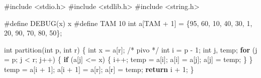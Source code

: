 \documentclass[
  brazilian,
  letterpaper,
]{book}
\newenvironment{Shaded}{\begin{snugshade}}{\end{snugshade}}
\newcommand{\CommentTok}[1]{\textcolor[rgb]{0.37,0.37,0.37}{#1}}
\newcommand{\ControlFlowTok}[1]{\textcolor[rgb]{0.00,0.23,0.31}{\textbf{#1}}}
\newcommand{\DataTypeTok}[1]{\textcolor[rgb]{0.68,0.00,0.00}{#1}}
\newcommand{\DecValTok}[1]{\textcolor[rgb]{0.68,0.00,0.00}{#1}}
\newcommand{\ImportTok}[1]{\textcolor[rgb]{0.00,0.46,0.62}{#1}}
\newcommand{\NormalTok}[1]{\textcolor[rgb]{0.00,0.23,0.31}{#1}}
\newcommand{\OperatorTok}[1]{\textcolor[rgb]{0.37,0.37,0.37}{#1}}
\newcommand{\PreprocessorTok}[1]{\textcolor[rgb]{0.68,0.00,0.00}{#1}}
\theoremstyle{plain}
\theoremstyle{definition}
\theoremstyle{remark}
\begin{document}
\begin{Shaded}
\begin{Highlighting}[]
\PreprocessorTok{\#include }\ImportTok{\textless{}stdio.h\textgreater{}}
\PreprocessorTok{\#include }\ImportTok{\textless{}stdlib.h\textgreater{}}
\PreprocessorTok{\#include }\ImportTok{\textless{}string.h\textgreater{}}

\PreprocessorTok{\#define DEBUG}\OperatorTok{(}\PreprocessorTok{x}\OperatorTok{)}\PreprocessorTok{ x}
\PreprocessorTok{\#define TAM }\DecValTok{10}
\DataTypeTok{int}\NormalTok{ a}\OperatorTok{[}\NormalTok{TAM }\OperatorTok{+} \DecValTok{1}\OperatorTok{]} \OperatorTok{=} 
  \OperatorTok{\{}\DecValTok{95}\OperatorTok{,} \DecValTok{60}\OperatorTok{,} \DecValTok{10}\OperatorTok{,} \DecValTok{40}\OperatorTok{,} \DecValTok{30}\OperatorTok{,} \DecValTok{1}\OperatorTok{,} \DecValTok{20}\OperatorTok{,} \DecValTok{90}\OperatorTok{,} \DecValTok{70}\OperatorTok{,} \DecValTok{80}\OperatorTok{,} \DecValTok{50}\OperatorTok{\};}

\DataTypeTok{int}\NormalTok{ partition}\OperatorTok{(}\DataTypeTok{int}\NormalTok{ p}\OperatorTok{,} \DataTypeTok{int}\NormalTok{ r}\OperatorTok{)}
\OperatorTok{\{}
    \DataTypeTok{int}\NormalTok{ x }\OperatorTok{=}\NormalTok{ a}\OperatorTok{[}\NormalTok{r}\OperatorTok{];} \CommentTok{/* pivo */}
    \DataTypeTok{int}\NormalTok{ i }\OperatorTok{=}\NormalTok{ p }\OperatorTok{{-}} \DecValTok{1}\OperatorTok{;}
    \DataTypeTok{int}\NormalTok{ j}\OperatorTok{,}\NormalTok{ temp}\OperatorTok{;}
    \ControlFlowTok{for} \OperatorTok{(}\NormalTok{j }\OperatorTok{=}\NormalTok{ p}\OperatorTok{;}\NormalTok{ j }\OperatorTok{\textless{}}\NormalTok{ r}\OperatorTok{;}\NormalTok{ j}\OperatorTok{++)}
    \OperatorTok{\{}
        \ControlFlowTok{if} \OperatorTok{(}\NormalTok{a}\OperatorTok{[}\NormalTok{j}\OperatorTok{]} \OperatorTok{\textless{}=}\NormalTok{ x}\OperatorTok{)}
        \OperatorTok{\{}
\NormalTok{            i}\OperatorTok{++;}
\NormalTok{            temp }\OperatorTok{=}\NormalTok{ a}\OperatorTok{[}\NormalTok{i}\OperatorTok{];}
\NormalTok{            a}\OperatorTok{[}\NormalTok{i}\OperatorTok{]} \OperatorTok{=}\NormalTok{ a}\OperatorTok{[}\NormalTok{j}\OperatorTok{];}
\NormalTok{            a}\OperatorTok{[}\NormalTok{j}\OperatorTok{]} \OperatorTok{=}\NormalTok{ temp}\OperatorTok{;}
        \OperatorTok{\}}
    \OperatorTok{\}}
\NormalTok{    temp }\OperatorTok{=}\NormalTok{ a}\OperatorTok{[}\NormalTok{i }\OperatorTok{+} \DecValTok{1}\OperatorTok{];}
\NormalTok{    a}\OperatorTok{[}\NormalTok{i }\OperatorTok{+} \DecValTok{1}\OperatorTok{]} \OperatorTok{=}\NormalTok{ a}\OperatorTok{[}\NormalTok{r}\OperatorTok{];}
\NormalTok{    a}\OperatorTok{[}\NormalTok{r}\OperatorTok{]} \OperatorTok{=}\NormalTok{ temp}\OperatorTok{;}
    \ControlFlowTok{return}\NormalTok{ i }\OperatorTok{+} \DecValTok{1}\OperatorTok{;}
\OperatorTok{\}}


\end{Highlighting}
\end{Shaded}
\end{document}
